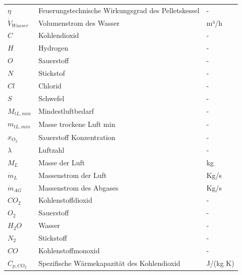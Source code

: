 \begin{longtable}{p{3 cm}p{10 cm}p{2 cm}}
\( \eta \)                  & Feuerungstechnische Wirkungsgrad des Pelletskessel&    -\\
\(\dot{V}_{Wasser}\)        & Volumenstrom des Wasser                           &    m³/h \\
\( C \)                     & Kohlendioxid                                      &    -\\
\( H \)                     & Hydrogen                                          &    -\\
\( O \)                     & Sauerstoff 			                            &       -\\
\( N \)                     & Stickstof 				                           &   -    \\
\( Cl \)                    & Chlorid 				                           &   -      \\
\( S \)                     & Schwefel				                           &   -      \\
\( M_{tL,min}\)             & Mindestluftbedarf		                           &   -   \\
\( m_{tL,min}\)             & Masse trockene Luft min	                       &       -      \\
\( x_{O_{2}}\)              & Sauerstoff Konzentration                          &    -      \\
\( \lambda \)               & Luftzahl				                           &   -      \\
\( M_{L}\)                  & Masse der Luft                                    &    kg\\
\( \dot{m}_{L}\)            & Massenstrom der Luft                              &    Kg/s\\
\( \dot{m}_{AG}\)           & Massenstrom des Abgases                           &    Kg/s\\
\( CO_{2} \)                & Kohlenstoffdioxid                                 &    -\\
\( O_{2} \)                 & Sauerstoff			                               &   -   \\
\( H_{2}O \)                & Wasser 				                           &       - \\
\( N_{2} \)                 & Stickstoff			                               &   -   \\
\( CO \)                    & Kohlenstoffmonoxid                                &    -\\
\( C_{p,CO_{2}}\)           & Spezifische Wärmekapazität des Kohlendioxid       &    J/(kg K)\\

\end{longtable}
